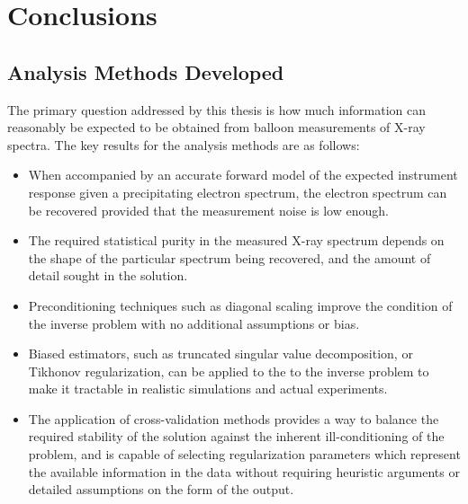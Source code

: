 \chapter{Conclusions}

\section{Analysis Methods Developed}

The primary question addressed by this thesis is how much information can reasonably be expected to be obtained from balloon measurements of X-ray spectra. The key results for the analysis methods are as follows:

\begin{itemize}
\item When accompanied by an accurate forward model of the expected instrument response given a precipitating electron spectrum, the electron spectrum can be recovered provided that the measurement noise is low enough. 
\item The required statistical purity in the measured X-ray spectrum depends on the shape of the particular spectrum being recovered, and the amount of detail sought in the solution.
\item Preconditioning techniques such as diagonal scaling improve the condition of the inverse problem with no additional assumptions or bias.
\item Biased estimators, such as truncated singular value decomposition, or Tikhonov regularization, can be applied to the to the inverse problem to make it tractable in realistic simulations and actual experiments. 
\item The application of cross-validation methods provides a way to balance the required stability of the solution against the inherent ill-conditioning of the problem, and is capable of selecting regularization parameters which represent the available information in the data without requiring heuristic arguments or detailed assumptions on the form of the output. 
\end{itemize}

